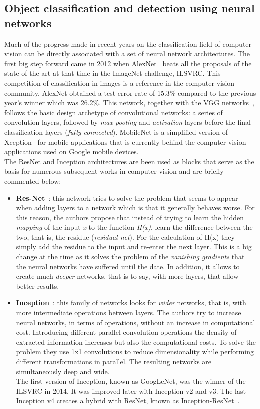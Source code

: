 \subsection{Object classification and detection using neural networks}
Much of the progress made in recent years on the classification field of computer vision can be directly associated with a set of neural network architectures. The first big step forward came in 2012 when AlexNet~\cite{krizhevsky2012imagenet} beats all the proposals of the state of the art at that time in the ImageNet challenge, ILSVRC. This competition of classification in images is a reference in the computer vision community. AlexNet obtained a test error rate of 15.3\% compared to the previous year's winner which was 26.2\%. This network, together with the VGG networks~\cite{simonyan2014very}, follows the basic design archetype of convolutional networks: a series of convolution layers, followed by \textit{max-pooling} and \textit{activation} layers before the final classification layers (\textit{fully-connected}). MobileNet is a simplified version of Xception~\cite{chollet2016xception} for mobile applications that is currently behind the computer vision applications used on Google mobile devices.\\
The ResNet and Inception architectures are been used as blocks that serve as the basis for numerous subsequent works in computer vision and are briefly commented below:
\begin{itemize}
\item \textbf{Res-Net}~\cite{he2016deep}: this network tries to solve the problem that seems to appear when adding layers to a network which is that it generally behaves worse. For this reason, the authors propose that instead of trying to learn the hidden \textit{mapping} of the input \textit{x} to the function \textit{H(x)}, learn the difference between the two, that is, the residue (\textit{residual net}). For the calculation of H(x) they simply add the residue to the input and re-enter the next layer. This is a big change at the time as it solves the problem of the \textit{vanishing gradients} that the neural networks have suffered until the date. In addition, it allows to create much \textit{deeper} networks, that is to say, with more layers, that allow better results.
\item \textbf{Inception}~\cite{szegedy2015going}: this family of networks looks for \textit{wider} networks, that is, with more intermediate operations between layers. The authors try to increase neural networks, in terms of operations, without an increase in computational cost. Introducing different parallel convolution operations the density of extracted information increases but also the computational costs. To solve the problem they use 1x1 convolutions to reduce dimensionality while performing different transformations in parallel. The resulting networks are simultaneously deep and wide.\\
The first version of Inception, known as GoogLeNet, was the winner of the ILSVRC in 2014. It was improved later with Inception v2 and v3. The last Inception v4 creates a hybrid with ResNet, known as Inception-ResNet~\cite{szegedy2017inception}.
\end{itemize}
